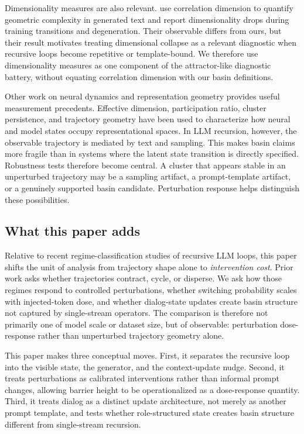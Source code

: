 \documentclass{article}
\theoremstyle{plain}
\theoremstyle{definition}
\begin{document}
Dimensionality measures are also relevant. \citet{arxiv251021258} use correlation dimension to quantify geometric complexity in generated text and report dimensionality drops during training transitions and degeneration. Their observable differs from ours, but their result motivates treating dimensional collapse as a relevant diagnostic when recursive loops become repetitive or template-bound. We therefore use dimensionality measures as one component of the attractor-like diagnostic battery, without equating correlation dimension with our basin definitions.

Other work on neural dynamics and representation geometry provides useful measurement precedents. Effective dimension, participation ratio, cluster persistence, and trajectory geometry have been used to characterize how neural and model states occupy representational spaces. In LLM recursion, however, the observable trajectory is mediated by text and sampling. This makes basin claims more fragile than in systems where the latent state transition is directly specified. Robustness tests therefore become central. A cluster that appears stable in an unperturbed trajectory may be a sampling artifact, a prompt-template artifact, or a genuinely supported basin candidate. Perturbation response helps distinguish these possibilities.

\subsection{What this paper adds}

Relative to recent regime-classification studies of recursive LLM loops, this paper shifts the unit of analysis from trajectory shape alone to \textit{intervention cost}. Prior work asks whether trajectories contract, cycle, or disperse. We ask how those regimes respond to controlled perturbations, whether switching probability scales with injected-token dose, and whether dialog-state updates create basin structure not captured by single-stream operators. The comparison is therefore not primarily one of model scale or dataset size, but of observable: perturbation dose-response rather than unperturbed trajectory geometry alone.

This paper makes three conceptual moves. First, it separates the recursive loop into the visible state, the generator, and the context-update nudge. Second, it treats perturbations as calibrated interventions rather than informal prompt changes, allowing barrier height to be operationalized as a dose-response quantity. Third, it treats dialog as a distinct update architecture, not merely as another prompt template, and tests whether role-structured state creates basin structure different from single-stream recursion.
\end{document}

